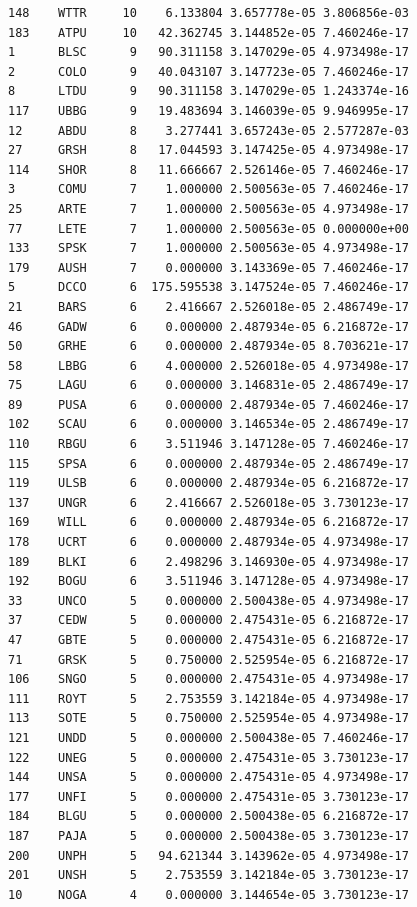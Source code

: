 \documentclass{statsoc}
\begin{document}
\begin{lstlisting}
148    WTTR     10    6.133804 3.657778e-05 3.806856e-03
183    ATPU     10   42.362745 3.144852e-05 7.460246e-17
1      BLSC      9   90.311158 3.147029e-05 4.973498e-17
2      COLO      9   40.043107 3.147723e-05 7.460246e-17
8      LTDU      9   90.311158 3.147029e-05 1.243374e-16
117    UBBG      9   19.483694 3.146039e-05 9.946995e-17
12     ABDU      8    3.277441 3.657243e-05 2.577287e-03
27     GRSH      8   17.044593 3.147425e-05 4.973498e-17
114    SHOR      8   11.666667 2.526146e-05 7.460246e-17
3      COMU      7    1.000000 2.500563e-05 7.460246e-17
25     ARTE      7    1.000000 2.500563e-05 4.973498e-17
77     LETE      7    1.000000 2.500563e-05 0.000000e+00
133    SPSK      7    1.000000 2.500563e-05 4.973498e-17
179    AUSH      7    0.000000 3.143369e-05 7.460246e-17
5      DCCO      6  175.595538 3.147524e-05 7.460246e-17
21     BARS      6    2.416667 2.526018e-05 2.486749e-17
46     GADW      6    0.000000 2.487934e-05 6.216872e-17
50     GRHE      6    0.000000 2.487934e-05 8.703621e-17
58     LBBG      6    4.000000 2.526018e-05 4.973498e-17
75     LAGU      6    0.000000 3.146831e-05 2.486749e-17
89     PUSA      6    0.000000 2.487934e-05 7.460246e-17
102    SCAU      6    0.000000 3.146534e-05 2.486749e-17
110    RBGU      6    3.511946 3.147128e-05 7.460246e-17
115    SPSA      6    0.000000 2.487934e-05 2.486749e-17
119    ULSB      6    0.000000 2.487934e-05 6.216872e-17
137    UNGR      6    2.416667 2.526018e-05 3.730123e-17
169    WILL      6    0.000000 2.487934e-05 6.216872e-17
178    UCRT      6    0.000000 2.487934e-05 4.973498e-17
189    BLKI      6    2.498296 3.146930e-05 4.973498e-17
192    BOGU      6    3.511946 3.147128e-05 4.973498e-17
33     UNCO      5    0.000000 2.500438e-05 4.973498e-17
37     CEDW      5    0.000000 2.475431e-05 6.216872e-17
47     GBTE      5    0.000000 2.475431e-05 6.216872e-17
71     GRSK      5    0.750000 2.525954e-05 6.216872e-17
106    SNGO      5    0.000000 2.475431e-05 4.973498e-17
111    ROYT      5    2.753559 3.142184e-05 4.973498e-17
113    SOTE      5    0.750000 2.525954e-05 4.973498e-17
121    UNDD      5    0.000000 2.500438e-05 7.460246e-17
122    UNEG      5    0.000000 2.475431e-05 3.730123e-17
144    UNSA      5    0.000000 2.475431e-05 4.973498e-17
177    UNFI      5    0.000000 2.475431e-05 3.730123e-17
184    BLGU      5    0.000000 2.500438e-05 6.216872e-17
187    PAJA      5    0.000000 2.500438e-05 3.730123e-17
200    UNPH      5   94.621344 3.143962e-05 4.973498e-17
201    UNSH      5    2.753559 3.142184e-05 3.730123e-17
10     NOGA      4    0.000000 3.144654e-05 3.730123e-17

\end{lstlisting}
\end{document}

